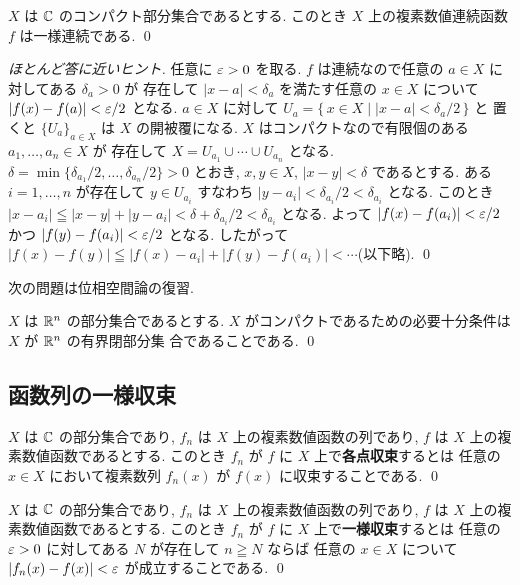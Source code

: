 \documentclass[12pt,twoside]{jarticle}
\begin{document}
\begin{question}[コンパクト集合上の連続函数は一様連続]
 $X$ は ${\mathbb C}$ のコンパクト部分集合であるとする. 
 このとき $X$ 上の複素数値連続函数 $f$ は一様連続である.
 \qed
\end{question}

\begin{proof}[ほとんど答に近いヒント]
 任意に $\varepsilon>0$ を取る.
 $f$ は連続なので任意の $a\in X$ に対してある $\delta_a>0$ が
 存在して $|x-a|<\delta_a$ を満たす任意の $x\in X$
 について $|f(x)-f(a)|<\varepsilon/2$ となる.
 $a\in X$ に対して $U_a=\{\,x\in X\mid |x-a|<\delta_a/2\,\}$ と
 置くと $\{U_a\}_{a\in X}$ は $X$ の開被覆になる.
 $X$ はコンパクトなので有限個のある $a_1,\ldots,a_n\in X$ が
 存在して $X=U_{a_1}\cup\cdots\cup U_{a_n}$ となる.
 $\delta=\min\{\delta_{a_1}/2,\ldots,\delta_{a_n}/2\}>0$ とおき, 
 $x,y\in X$, $|x-y|<\delta$ であるとする.
 ある $i=1,\ldots,n$ が存在して $y\in U_{a_i}$ 
 すなわち $|y-a_i|<\delta_{a_i}/2<\delta_{a_i}$ となる.
 このとき $|x-a_i|\leqq|x-y|+|y-a_i|<\delta+\delta_{a_i}/2<\delta_{a_i}$
 となる. 
 よって $|f(x)-f(a_i)|<\varepsilon/2$ かつ $|f(y)-f(a_i)|<\varepsilon/2$ となる. 
 したがって $|f(x)-f(y)|\leqq|f(x)-a_i|+|f(y)-f(a_i)|<\cdots$(以下略).
 \qed
\end{proof}

次の問題は位相空間論の復習.

\begin{question}[$\R^n$ のコンパクト部分集合の特徴付け]
 $X$ は $\R^n$ の部分集合であるとする.
 $X$ がコンパクトであるための必要十分条件は $X$ が $\R^n$ の有界閉部分集
 合であることである. 
 \qed
\end{question}


\subsection{函数列の一様収束}

\begin{definition}[函数列の各点収束]
 $X$ は ${\mathbb C}$ の部分集合であり, $f_n$ は $X$ 上の複素数値函数の列であり, 
 $f$ は $X$ 上の複素数値函数であるとする.
 このとき $f_n$ が $f$ に $X$ 上で{\bf 各点収束}するとは
 任意の $x\in X$ において複素数列 $f_n(x)$ が $f(x)$ に収束することである.
 \qed
\end{definition}

\begin{definition}[函数列の一様収束]
 $X$ は ${\mathbb C}$ の部分集合であり, $f_n$ は $X$ 上の複素数値函数の列であり, 
 $f$ は $X$ 上の複素数値函数であるとする.
 このとき $f_n$ が $f$ に $X$ 上で{\bf 一様収束}するとは
 任意の $\varepsilon>0$ に対してある $N$ が存在して $n\geqq N$ ならば
 任意の $x\in X$ について $|f_n(x)-f(x)|<\varepsilon$ が成立することである.
 \qed
\end{definition}
\end{document}
